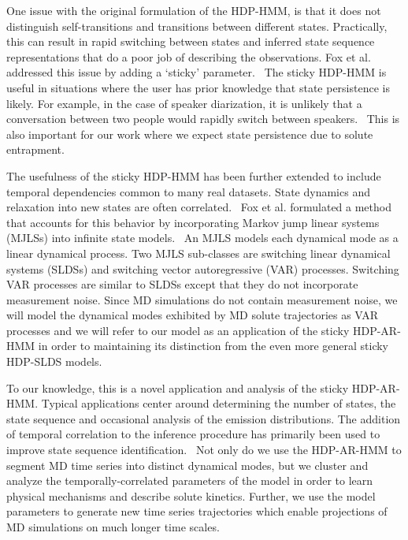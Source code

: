 \documentclass[journal=jpcbfk,manuscript=article]{achemso}
\begin{document}
  One issue with the original formulation of the HDP-HMM, is that it does 
  not distinguish self-transitions and transitions between different states.
  Practically, this can result in rapid switching between states and inferred
  state sequence representations that do a poor job of describing the 
  observations. Fox et al. addressed this issue by adding a `sticky' 
  parameter.~\cite{fox_sticky_2007} The sticky HDP-HMM is useful in situations
  where the user has prior knowledge that state persistence is likely.
  For example, in the case of speaker diarization, it is unlikely that a 
  conversation between two people would rapidly switch between speakers.~\cite{fox_sticky_2011}
  This is also important for our work where we expect state persistence due
  to solute entrapment.   
  
  The usefulness of the sticky HDP-HMM has been further extended to include 
  temporal dependencies common to many real datasets. State dynamics and 
  relaxation into new states are often correlated.~\cite{calderon_data-driven_2014}
  Fox et al. formulated a method that accounts for this behavior by
  incorporating Markov jump linear systems (MJLSs) into infinite state 
  models.~\cite{fox_nonparametric_2009} An MJLS models each dynamical mode
  as a linear dynamical process. Two MJLS sub-classes are switching linear
  dynamical systems (SLDSs) and switching vector autoregressive (VAR) processes.
  Switching VAR processes are similar to SLDSs except that they do not
  incorporate measurement noise. Since MD simulations do not contain measurement
  noise, we will model the dynamical modes exhibited by MD solute trajectories 
  as VAR processes and we will refer to our model as an application of the 
  sticky HDP-AR-HMM in order to maintaining its distinction from the even more
  general sticky HDP-SLDS models.
  
  To our knowledge, this is a novel application and analysis of the sticky 
  HDP-AR-HMM. Typical applications center around determining the number of
  states, the state sequence and occasional analysis of the emission 
  distributions. The addition of temporal correlation to the inference 
  procedure has primarily been used to improve state sequence 
  identification.~\cite{calderon_inferring_2015,hamada_modeling_2016}
  Not only do we use the HDP-AR-HMM to segment MD time series into distinct
  dynamical modes, but we cluster and analyze the temporally-correlated 
  parameters of the model in order to learn physical mechanisms and describe
  solute kinetics. Further, we use the model parameters to generate new 
  time series trajectories which enable projections of MD simulations on 
  much longer time scales.
  
\end{document}
